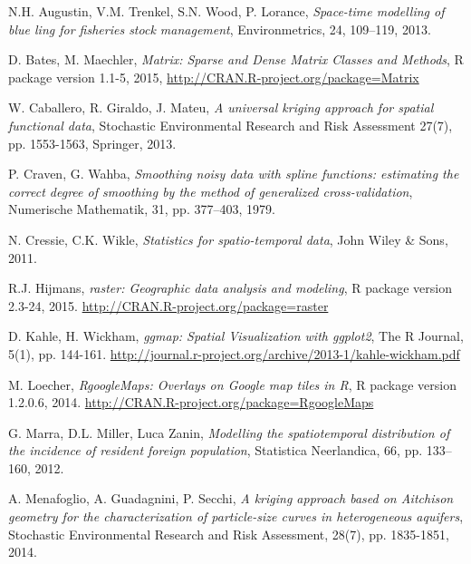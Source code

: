 \documentclass[a4paper,11pt,twoside,openright]{book}							%
\begin{document}
\begin{thebibliography}{99}


N.H. Augustin, V.M. Trenkel, S.N. Wood, P. Lorance, \emph{Space-time modelling of blue ling for fisheries stock management}, Environmetrics, 24, 109–119, 2013.

D. Bates, M. Maechler, \emph{Matrix: Sparse and Dense Matrix Classes and Methods}, R package version 1.1-5, 2015, \href{http://CRAN.R-project.org/package=Matrix}{http://CRAN.R-project.org/package=Matrix}

W. Caballero, R. Giraldo, J. Mateu, \emph{A universal kriging approach for spatial functional data}, Stochastic Environmental Research and Risk Assessment 27(7), pp. 1553-1563, Springer, 2013.

P. Craven, G. Wahba, \emph{Smoothing noisy data with spline functions: estimating the correct degree of smoothing by the method of generalized cross-validation}, Numerische Mathematik, 31, pp. 377–403, 1979.

N. Cressie, C.K. Wikle, \emph{Statistics for spatio-temporal data}, John Wiley \& Sons, 2011.

R.J. Hijmans, \emph{raster: Geographic data analysis and modeling}, R package version 2.3-24, 2015. \href{http://CRAN.R-project.org/package=raster}{http://CRAN.R-project.org/package=raster}

D. Kahle, H. Wickham, \emph{ggmap: Spatial Visualization with ggplot2}, The R Journal, 5(1), pp. 144-161. \href{http://journal.r-project.org/archive/2013-1/kahle-wickham.pdf}{http://journal.r-project.org/archive/2013-1/kahle-wickham.pdf}

M. Loecher, \emph{RgoogleMaps: Overlays on Google map tiles in R}, R package version 1.2.0.6, 2014. \href{http://CRAN.R-project.org/package=RgoogleMaps}{http://CRAN.R-project.org/package=RgoogleMaps}

G. Marra, D.L. Miller, Luca Zanin, \emph{Modelling the spatiotemporal distribution of the incidence of resident foreign population}, Statistica Neerlandica, 66, pp. 133–160, 2012.

A. Menafoglio, A. Guadagnini, P. Secchi, \emph{A kriging approach based on Aitchison geometry for the characterization of particle-size curves in heterogeneous aquifers}, Stochastic Environmental Research and Risk Assessment, 28(7), pp. 1835-1851, 2014.


\end{thebibliography}
\end{document}
